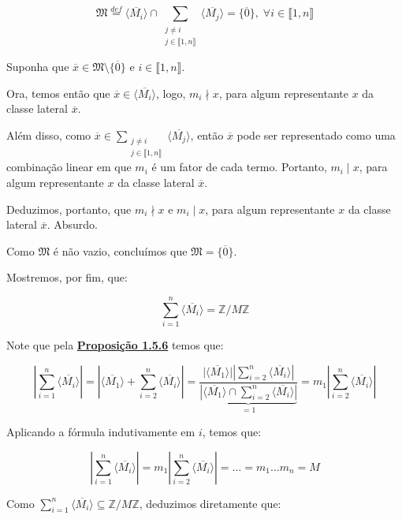 \documentclass[16pt,openany]{book}
\theoremstyle{definition}
\begin{document}
\[
\mathfrak{M} \overset{def}{=} \langle \overline{M_i} \rangle \cap \sum_{\substack{j\neq i \\ j\in\llbracket 1, n\rrbracket}} \langle \overline{M_j} \rangle = \{\overline{0}\}, \; \forall i\in \llbracket 1,n\rrbracket
\]

Suponha que $\overline{x}\in \mathfrak{M}\setminus\{\overline{0}\}$ e $i\in\llbracket 1,n\rrbracket$.

Ora, temos então que $\overline{x}\in \langle \overline{M_i} \rangle$, logo, $m_i \nmid x$, para algum representante $x$ da classe lateral $\overline{x}$.

Além disso, como $\overline{x}\in \sum_{\substack{j\neq i \\ j\in\llbracket 1, n\rrbracket}} \langle \overline{M_j} \rangle$, então $\overline{x}$ pode ser representado como uma combinação linear em que $m_i$ é um fator de cada termo. Portanto, $m_i \mid x$, para algum representante $x$ da classe lateral $\overline{x}$.

Deduzimos, portanto, que $m_i \nmid x$ e $m_i \mid x$, para algum representante $x$ da classe lateral $\overline{x}$. Absurdo.

Como $\mathfrak{M}$ é não vazio, concluímos que $\mathfrak{M} = \{\overline{0}\}$.

Mostremos, por fim, que:

\[
\sum_{i=1}^{n} \langle \overline{M_i} \rangle = \mathbb{Z}/M\mathbb{Z}
\]

Note que pela \hyperlink{prop156}{\textbf{Proposição 1.5.6}} temos que:

\[
\left\vert \sum_{i=1}^{n} \langle \overline{M_i} \rangle \right\vert = \left\vert \langle \overline{M_1} \rangle + \sum_{i=2}^{n} \langle \overline{M_i} \rangle \right\vert = \frac{\vert \langle \overline{M_1} \rangle\vert \displaystyle\left\vert \sum_{i=2}^{n} \langle \overline{M_i} \rangle \right\vert}{\underbrace{\left\vert \langle \overline{M_1}\rangle \cap \sum_{i=2}^{n} \langle \overline{M_i} \rangle \right\vert}_{=1}} = m_1\left\vert \sum_{i=2}^{n}\langle \overline{M_i} \rangle \right\vert
\]

Aplicando a fórmula indutivamente em $i$, temos que:

\[
\left\vert \sum_{i=1}^{n} \langle \overline{M_i}\rangle \right\vert = m_1\left\vert \sum_{i=2}^{n}\langle \overline{M_i} \rangle \right\vert = \ldots = m_1 \ldots m_n = M
\]

Como $\sum_{i=1}^{n} \langle \overline{M_i} \rangle \subseteq \mathbb{Z}/M\mathbb{Z}$, deduzimos diretamente que:
\end{document}
